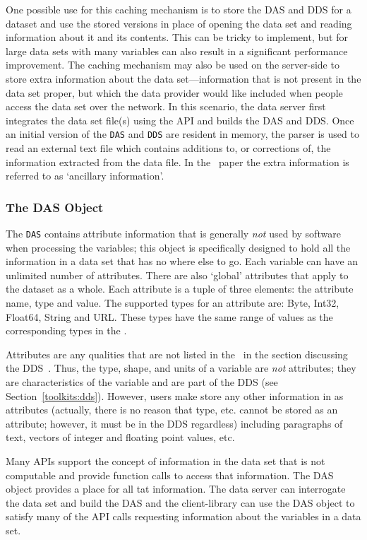 One possible use for this caching mechanism is to store the DAS and DDS for a
dataset and use the stored versions in place of opening the data set and
reading information about it and its contents. This can be tricky to
implement, but for large data sets with many variables can also result in a
significant performance improvement. The caching mechanism may also be used
on the server-side to store extra information about the data
set---information that is not present in the data set proper, but which the
data provider would like included when people access the data set over the
network. In this scenario, the data server first integrates the data set
file(s) using the API and builds the DAS and DDS. Once an initial version of
the {\tt DAS} and {\tt DDS} are resident in memory, the parser is used to
read an external text file which contains additions to, or corrections of,
the information extracted from the data file. In the \Ddd\ paper the extra
information is referred to as `ancillary information'.

\subsubsection{The DAS Object}
\label{toolkits:das}

The {\tt DAS} contains attribute information that is generally {\em not\/}
used by software when processing the variables; this object is specifically
designed to hold all the information in a data set that has no where else to
go. Each variable can have an unlimited number of attributes. There are also
`global' attributes that apply to the dataset as a whole. Each attribute is a
tuple of three elements: the attribute name, type and value. The supported
types for an attribute are: Byte, Int32, Float64, String and URL. These types
have the same range of values as the corresponding types in the \dap.

Attributes are any qualities that are not listed in the \dap\ in the section
discussing the DDS~.  Thus, the type, shape, and units
of a variable are {\em not\/} attributes; they are characteristics of the
variable and are part of the DDS (see Section~\ref{toolkits:dds}). However,
users make store any other information in as attributes (actually, there is
no reason that type, etc. cannot be stored as an attribute; however, it must
be in the DDS regardless) including paragraphs of text, vectors of integer
and floating point values, etc.

Many APIs support the concept of information in the data set that is not
computable and provide function calls to access that information. The DAS
object provides a place for all tat information. The data server can
interrogate the data set and build the DAS and the client-library can use the
DAS object to satisfy many of the API calls requesting information about the
variables in a data set.

